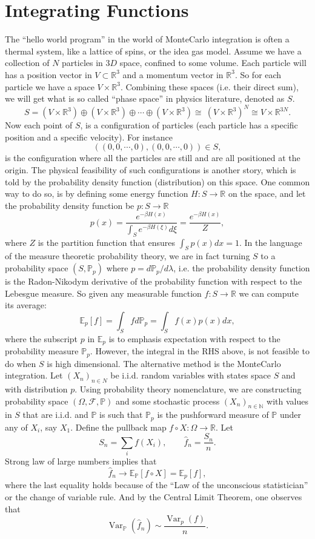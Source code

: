 \documentclass[11pt,a4paper]{article}
\theoremstyle{definition}
\theoremstyle{Example}
\newcommand{\Prob}{\mathbb{P}}
\newcommand{\N}{\mathbb{N}}
\newcommand{\R}{\mathbb{R}}
\newcommand{\E}{\mathbb{E}}
\begin{document}
	\section{Integrating Functions}
	The ``hello world program'' in the world of MonteCarlo integration is often a thermal system, like a lattice of spins, or the idea gas model. Assume we have a collection of $ N $ particles in $ 3D $ space, confined to some volume. Each particle will has a position vector in $ V \subset \R^3 $ and a momentum vector in $ \R^3 $. So for each particle we have a space $ V\times\R^3 $. Combining these spaces (i.e. their direct sum), we will get what is so called ``phase space'' in physics literature, denoted as $ S $.
	\[ S = (V\times\R^3)\oplus(V\times\R^3)\oplus\cdots\oplus(V\times\R^3)\cong \ (V\times\R^3)^{N} \cong V\times\R^{3N}. \]
	Now each point of $ S $, is a configuration of particles (each particle has a specific position and a specific velocity). For instance 
	\[ ((0,0,\cdots,0),(0,0,\cdots,0)) \in S, \]
	is the configuration where all the particles are still and are all positioned at the origin. The physical feasibility of such configurations is another story, which is told by the probability density function (distribution) on this space. One common way to do so, is by defining some energy function $ H:S\to\R $ on the space, and let the probability density function be $ p:S\to\R $
	\[ p(x) = \frac{e^{-\beta H(x)}}{\int_S e^{-\beta H(\xi)}d\xi} = \frac{e^{-\beta H(x)}}{Z},  \]
	where $ Z $ is the partition function that ensures $ \int_S p(x) dx  = 1$. In the language of the measure theoretic probability theory, we are in fact turning $ S $ to a probability space $ (S,\Prob_p) $ where $ p  = d\Prob_p/d\lambda $, i.e. the probability density function is the Radon-Nikodym derivative of the probability function with respect to the Lebesgue measure. So given any measurable function $ f:S\to\R $ we can compute its average:
	\[ \E_p[f]  = \int_S f d\Prob_p = \int_S f(x)p(x) dx, \]
	where the subscript $ p $ in $ \E_p $ is to emphasis expectation with respect to the probability measure $ \Prob_p $. However, the integral in the RHS above, is not feasible to do when $ S $ is high dimensional. The alternative method is the MonteCarlo integration. Let $ (X_n)_{n\in N} $ be i.i.d. random variables with states space $ S $ and with distribution $ p $. Using probability theory nomenclature, we are constructing probability space $ (\Omega,\mathcal{F},\Prob) $ and some stochastic process $ (X_n)_{n\in\N} $ with values in $ S $ that are i.i.d. and $ \Prob $ is such that $ \Prob_p $ is the pushforward measure of $ \Prob $ under any of $ X_i $, say $ X_1 $. Define the pullback map $ f\circ X:\Omega \to \R $. Let
	\[ S_n = \sum_i f(X_i), \qquad \hat{f}_n = \frac{S_n}{n}. \]
	Strong law of large numbers implies that
	\[ \hat{f}_n \to \E_\Prob[f\circ X] = \E_p[f], \]
	where the last equality holds because of the ``Law of the unconscious statistician'' or the change of variable rule. And by the Central Limit Theorem, one observes that
	\[ \operatorname{Var}_\Prob(\hat{f}_n) \sim \frac{\operatorname{Var}_p(f)}{{n}}. \]
	
\end{document}
